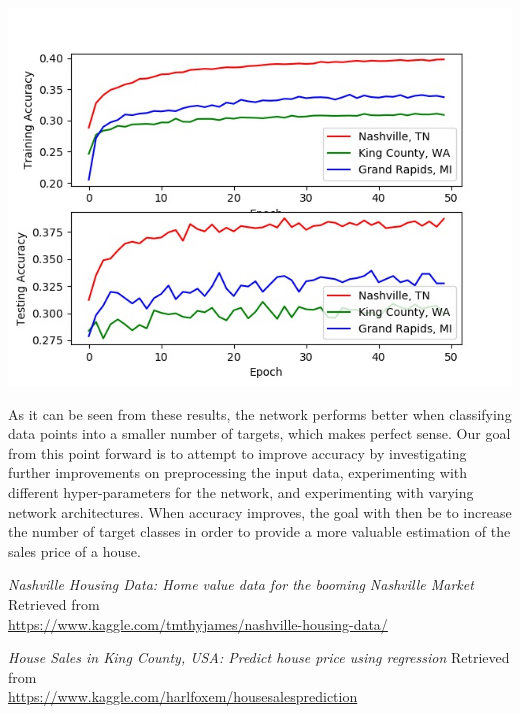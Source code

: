 \documentclass[letter,10pt]{article}
\begin{document}
\begin{multicols}{2}
\begin{center}
			\label{fig:fig_nn_results_5}
		\end{center}
		\begin{center}
			\includegraphics[scale=0.38]{NeuralNet/nn_10_class_results} \\
			\label{fig:fig_nn_results_10}
		\end{center}
		As it can be seen from these results, the network performs better when classifying data points into a smaller number of targets, which makes perfect sense. Our goal from this point forward is to attempt to improve accuracy by investigating further improvements on preprocessing the input data, experimenting with different hyper-parameters for the network, and experimenting with varying network architectures. When accuracy improves, the goal with then be to increase the number of target classes in order to provide a more valuable estimation of the sales price of a house.

		\begin{thebibliography}{13}
			\textit{Nashville Housing Data: Home value data for the booming Nashville Market}
			Retrieved from \\ \small{\url{https://www.kaggle.com/tmthyjames/nashville-housing-data/}}
			
			\textit{House Sales in King County, USA: Predict house price using regression}
			Retrieved from \\ \small{\url{https://www.kaggle.com/harlfoxem/housesalesprediction}}	
			

\end{thebibliography}
\end{multicols}
\end{document}
